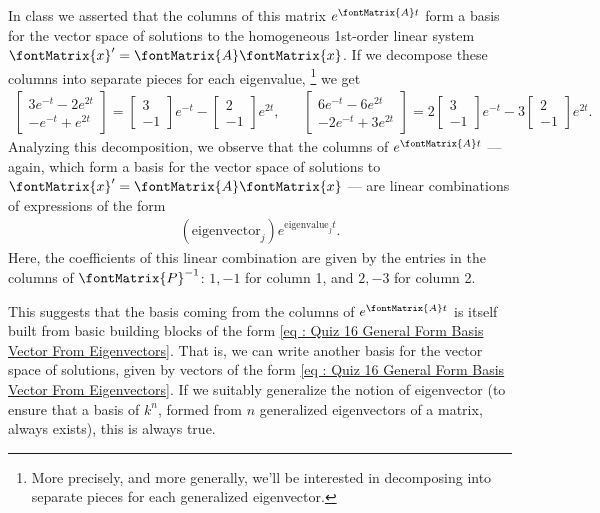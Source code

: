{In class we asserted that the columns of this matrix $e^{\fontMatrix{A} t}$ form a basis for the vector space of solutions to the homogeneous 1st-order linear system $\fontMatrix{x}' = \fontMatrix{A} \fontMatrix{x}$. If we decompose these columns into separate pieces for each eigenvalue,%
\footnote{More precisely, and more generally, we'll be interested in decomposing into separate pieces for each generalized eigenvector.} %
we get
\begin{align*}
\begin{bmatrix}
3 e^{-t} - 2 e^{2 t}	\\
-e^{-t} + e^{2 t}
\end{bmatrix}
=
\begin{bmatrix}
3	\\
-1
\end{bmatrix}
e^{-t}
-
\begin{bmatrix}
2	\\
-1
\end{bmatrix}
e^{2 t},
&&
\begin{bmatrix}
6 e^{-t} - 6 e^{2 t}	\\
-2 e^{-t} + 3 e^{2 t}
\end{bmatrix}
=
2
\begin{bmatrix}
3	\\
-1
\end{bmatrix}
e^{-t}
-
3
\begin{bmatrix}
2	\\
-1
\end{bmatrix}
e^{2 t}.
\end{align*}
Analyzing this decomposition, we observe that the columns of $e^{\fontMatrix{A} t}$ --- again, which form a basis for the vector space of solutions to $\fontMatrix{x}' = \fontMatrix{A} \fontMatrix{x}$ --- are linear combinations of expressions of the form
\begin{align}
(\text{eigenvector}_{j}) e^{\text{eigenvalue}_{j} t}.%
\label{eq : Quiz 16 General Form Basis Vector From Eigenvectors}
\end{align}
Here, the coefficients of this linear combination are given by the entries in the columns of $\fontMatrix{P}^{-1}$: $1,-1$ for column 1, and $2,-3$ for column 2.

This suggests that the basis coming from the columns of $e^{\fontMatrix{A} t}$ is itself built from basic building blocks of the form \eqref{eq : Quiz 16 General Form Basis Vector From Eigenvectors}. That is, we can write another basis for the vector space of solutions, given by vectors of the form \eqref{eq : Quiz 16 General Form Basis Vector From Eigenvectors}. If we suitably generalize the notion of eigenvector (to ensure that a basis of $k^{n}$, formed from $n$ generalized eigenvectors of a matrix, always exists), this is always true.}%




